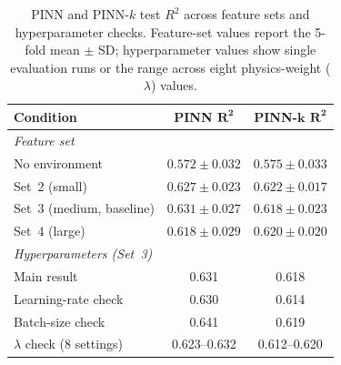 \documentclass[logo,msc,ai]{infthesis}           %
\begin{document}
\begin{table}[H]
\centering
\scriptsize
\renewcommand{\arraystretch}{0.9}
\setlength{\tabcolsep}{18pt}
\begin{tabular}{lcc}
\toprule
\textbf{Condition} & \textbf{PINN} $\mathbf{R^2}$ & \textbf{PINN-}$\mathbf{k}$ $\mathbf{R^2}$ \\
\midrule
\multicolumn{3}{l}{\textit{Feature set}} \\
No environment               & $0.572 \pm 0.032$ & $0.575 \pm 0.033$ \\
Set~2 (small)                & $0.627 \pm 0.023$ & $0.622 \pm 0.017$ \\
Set~3 (medium, baseline)     & $0.631 \pm 0.027$ & $0.618 \pm 0.023$ \\
Set~4 (large)                & $0.618 \pm 0.029$ & $0.620 \pm 0.020$ \\
\midrule
\multicolumn{3}{l}{\textit{Hyperparameters (Set~3)}} \\
Main result                  & 0.631             & 0.618             \\
Learning-rate check          & 0.630             & 0.614             \\
Batch-size check             & 0.641             & 0.619             \\
$\lambda$ check (8 settings) & 0.623--0.632      & 0.612--0.620      \\
\bottomrule
\end{tabular}
\caption{\footnotesize{PINN and PINN-$k$ test $R^2$ across feature sets and hyperparameter checks. Feature-set values report the 5-fold mean $\pm$ SD; hyperparameter values show single evaluation runs or the range across eight physics-weight ($\lambda$) values.}}
\label{tab:pinn-conditions}
\end{table}
\end{document}
